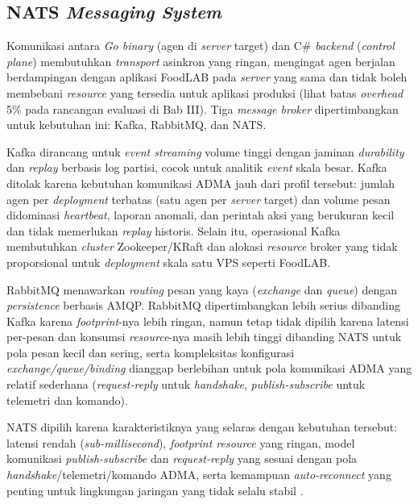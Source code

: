 \subsection{NATS \textit{Messaging System}}

Komunikasi antara \textit{Go binary} (agen di \textit{server} target) dan C\# \textit{backend} (\textit{control plane}) membutuhkan \textit{transport} asinkron yang ringan, mengingat agen berjalan berdampingan dengan aplikasi FoodLAB pada \textit{server} yang sama dan tidak boleh membebani \textit{resource} yang tersedia untuk aplikasi produksi (lihat batas \textit{overhead} 5\% pada rancangan evaluasi di Bab III). Tiga \textit{message broker} dipertimbangkan untuk kebutuhan ini: Kafka, RabbitMQ, dan NATS.

Kafka dirancang untuk \textit{event streaming} volume tinggi dengan jaminan \textit{durability} dan \textit{replay} berbasis log partisi, cocok untuk analitik \textit{event} skala besar. Kafka ditolak karena kebutuhan komunikasi ADMA jauh dari profil tersebut: jumlah agen per \textit{deployment} terbatas (satu agen per \textit{server} target) dan volume pesan didominasi \textit{heartbeat}, laporan anomali, dan perintah aksi yang berukuran kecil dan tidak memerlukan \textit{replay} historis. Selain itu, operasional Kafka membutuhkan \textit{cluster} Zookeeper/KRaft dan alokasi \textit{resource} broker yang tidak proporsional untuk \textit{deployment} skala satu VPS seperti FoodLAB.

RabbitMQ menawarkan \textit{routing} pesan yang kaya (\textit{exchange} dan \textit{queue}) dengan \textit{persistence} berbasis AMQP. RabbitMQ dipertimbangkan lebih serius dibanding Kafka karena \textit{footprint}-nya lebih ringan, namun tetap tidak dipilih karena latensi per-pesan dan konsumsi \textit{resource}-nya masih lebih tinggi dibanding NATS untuk pola pesan kecil dan sering, serta kompleksitas konfigurasi \textit{exchange/queue/binding} dianggap berlebihan untuk pola komunikasi ADMA yang relatif sederhana (\textit{request-reply} untuk \textit{handshake}, \textit{publish-subscribe} untuk telemetri dan komando).

NATS dipilih karena karakteristiknya yang selaras dengan kebutuhan tersebut: latensi rendah (\textit{sub-millisecond}), \textit{footprint resource} yang ringan, model komunikasi \textit{publish-subscribe} dan \textit{request-reply} yang sesuai dengan pola \textit{handshake}/telemetri/komando ADMA, serta kemampuan \textit{auto-reconnect} yang penting untuk lingkungan jaringan yang tidak selalu stabil \cite{ibrahim2026nats}.

